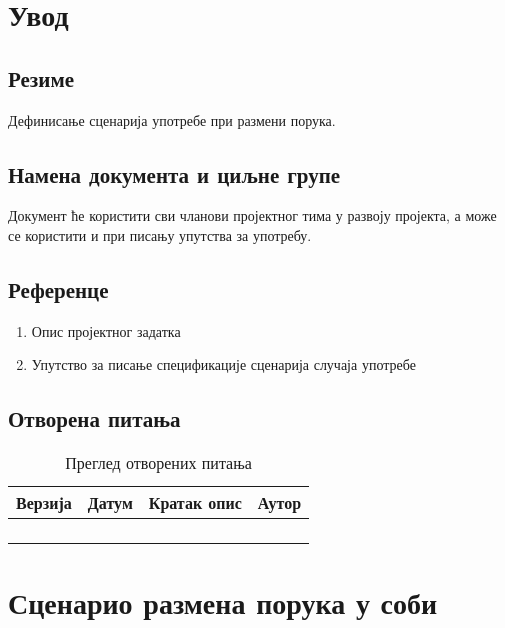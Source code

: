\section{Увод}

\subsection{Резиме}
Дефинисање сценарија употребе при размени порука.

\subsection{Намена документа и циљне групе}
Документ ће користити сви чланови пројектног тима у развоју пројекта, а може се 
користити и при писању упутства за употребу.

\subsection{Референце}
\begin{enumerate}
	\item Опис пројектног задатка
	\item Упутство за писање спецификације сценарија случаја употребе
\end{enumerate}

\subsection{Отворена питања}
\begin{table}[h!]
\centering
	
	\begin{tabu}{ || X[l] | X[l] | X[l] | X[l] || }
	\hline
	\textbf{Верзија} & \textbf{Датум} & \textbf{Кратак опис} & \textbf{Аутор} \\
	\hline
	\hline
	& & &\\
	\hline
	& & &\\
	\hline
	& & &\\
	\hline
	& & &\\
	\hline
	\end{tabu}
	\caption{Преглед отворених питања}
	\label{table:2}
		
\end{table}



\section{Сценарио размена порука у соби}

